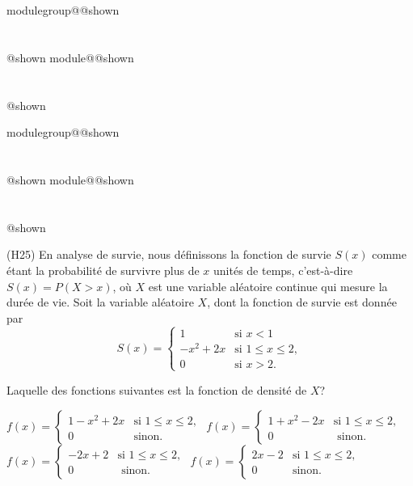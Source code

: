 \documentclass{Evaluation}
\makeatletter
\newcommand{\currentmodulekey}{}
\newcommand{\currentmoduletitle}{}
\newcommand{\currentgroupkey}{}
\newcommand{\currentgrouptitle}{}
\newcommand{\showmoduleifneeded}{%
  \ifx\currentgroupkey\empty\else
    \expandafter\ifx\csname modulegroup@\currentgroupkey @shown\endcsname\relax
      \section*{\currentgrouptitle}%
      \expandafter\gdef\csname modulegroup@\currentgroupkey @shown\endcsname{1}%
    \fi
  \fi
  \expandafter\ifx\csname module@\currentmodulekey @shown\endcsname\relax
    \section*{\currentmoduletitle}%
    \expandafter\gdef\csname module@\currentmodulekey @shown\endcsname{1}%
  \fi
}
\newenvironment{A22}{\showmoduleifneeded}{}
\newenvironment{H25}{\showmoduleifneeded}{}
\makeatother
\begin{document}
\begin{questions}
\begin{A22}
\begin{parts}

\end{parts}

\end{A22}

\begin{H25}
\question
(H25) En analyse de survie, nous définissons la fonction de survie $S(x)$ comme étant la probabilité de survivre plus de $x$ unités de temps, c'est-à-dire $S(x)=P(X>x)$, où $X$ est une variable aléatoire continue qui mesure la durée de vie.  Soit la variable aléatoire $X$, dont la fonction de survie est donnée par 
\[ S(x) =
\begin{cases}
1 & \text{si } x<1\\
   \displaystyle -x^2+2x& \text{si } 1\leq x\leq 2, \\
    0 & \text{si } x>2.
\end{cases}
\]

Laquelle des fonctions suivantes est la fonction de densité de $X$?

\begin{checkboxes}
\choice $f(x)=\left\{
			\begin{array}{ll}
   \displaystyle 1-x^2+2x& \text{si } 1\leq x\leq 2, \\
			0 & \mbox{sinon.}
			\end{array}
			\right. $
		\vspace{0.3cm}
\correctchoice $ f(x) = \left\{
			\begin{array}{ll}
   \displaystyle 1+x^2-2x& \text{si } 1\leq x\leq 2, \\
			0 & \mbox{ sinon.}
			\end{array}
			\right. $
   		\vspace{0.3cm}
\choice $ f(x) = \left\{
			\begin{array}{ll}
   \displaystyle -2x+2& \text{si } 1\leq x\leq 2, \\
			0 & \mbox{ sinon.}
			\end{array}
			\right. $
   		\vspace{0.3cm}
\choice $ f(x) = \left\{
			\begin{array}{ll}
   \displaystyle 2x-2& \text{si } 1\leq x\leq 2, \\
			0 & \mbox{sinon.}
			\end{array}
			\right. $
   		\vspace{0.3cm}


\end{checkboxes}
\end{H25}
\end{questions}
\end{document}

